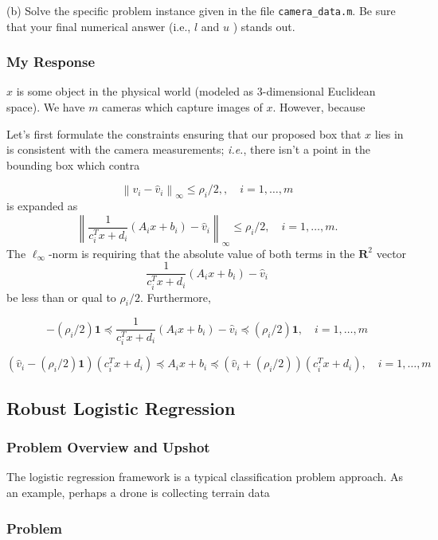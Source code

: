 \documentclass[12pt,reqno]{article}
\theoremstyle{definition}
\numberwithin{equation}{section}
\begin{document}
\vspace{0.1cm}
\noindent (b) Solve the specific problem instance given in the file \lstinline|camera_data.m|. Be sure that your final numerical answer (i.e., $l$ and $u$ ) stands out.

\subsubsection*{My Response}

$x$ is some object in the physical world (modeled as 3-dimensional Euclidean space). We have $m$ cameras which capture images
of $x$. However, because

Let's first formulate the constraints ensuring that our proposed box that $x$ lies in is consistent with the camera measurements;
\textit{i.e.}, there isn't a point in the bounding box which contra

\[\left\lVert v_i - \hat{v}_i \right\rVert_{\infty} \le \rho_i / 2, , \quad i = 1, \ldots, m\]
is expanded as 
\[\left\lVert \frac{1}{c_i^T x+d_i}\left(A_i x+b_i\right) - \hat{v}_i \right\rVert_{\infty} \le \rho_i/2, \quad i = 1, \ldots, m.\]
The $\ell_{\infty}$-norm is requiring that the absolute value of both terms in the $\mathbf{R}^2$ vector
\[\frac{1}{c_i^T x+d_i}\left(A_i x+b_i\right) - \hat{v}_i\]
be less than or qual to $\rho_i/2$. Furthermore,

\[-(\rho_i/2) \bm{1} \preceq \frac{1}{c_i^T x+d_i}\left(A_i x+b_i\right) - \hat{v}_i \preceq (\rho_i/2) \bm{1}, \quad i = 1, \ldots, m\]

\[(\hat{v}_i - (\rho_i/2) \bm{1})(c_i^T x + d_i) \preceq A_i x + b_i \preceq (\hat{v}_i + (\rho_i/2))(c_i^Tx + d_i), \quad i = 1, \ldots, m\]

\subsection{Robust Logistic Regression}

\subsubsection*{Problem Overview and Upshot}
The logistic regression framework is a typical classification problem approach. As an example,
perhaps a drone is collecting terrain data 

\subsubsection*{Problem}
\end{document}
